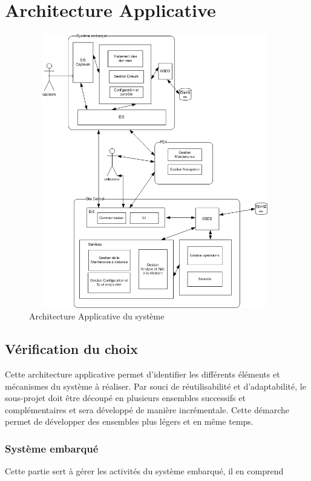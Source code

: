 \section{Architecture Applicative}

\begin{figure}[h]
\centering
\includegraphics[width=11cm,height=12cm]{archiAppli.png}
\caption{Architecture Applicative du système}
\end{figure}

\subsection{Vérification du choix}
	Cette architecture applicative permet d'identifier les différents éléments et mécanismes du système à réaliser. Par souci de réutilisabilité et d’adaptabilité, le sous-projet doit être découpé en plusieurs ensembles successifs et complémentaires et sera développé de manière incrémentale. Cette démarche permet de développer des ensembles plus légers et en même temps.

\subsubsection{Système embarqué} Cette partie sert à gérer les activités du système embarqué, il en comprend


